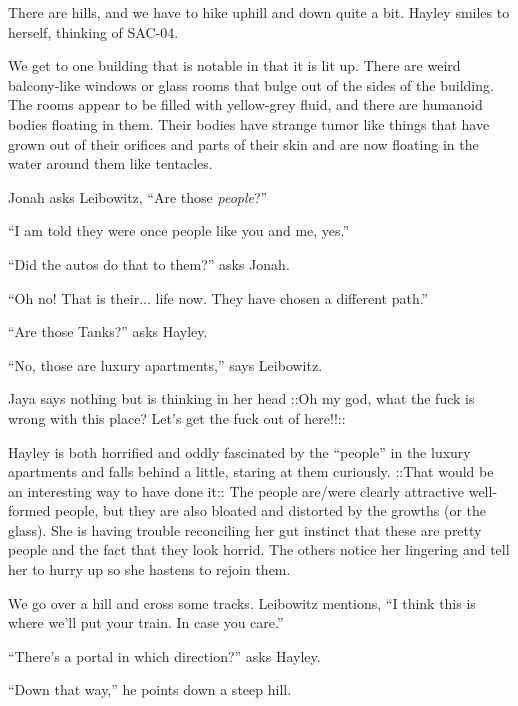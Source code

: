 There are hills, and we have to hike uphill and down quite a bit.  Hayley smiles to herself, thinking of SAC-04.  



We get to one building that is notable in that it is lit up.  There are weird balcony-like windows or glass rooms that bulge out of the sides of the building.  The rooms appear to be filled with yellow-grey fluid, and there are humanoid bodies floating in them.  Their bodies have strange tumor like things that have grown out of their orifices and parts of their skin and are now floating in the water around them like tentacles.



Jonah asks Leibowitz, ``Are those \textit{people}?''

``I am told they were once people like you and me, yes.''

``Did the autos do that to them?'' asks Jonah.

``Oh no!  That is their... life now. They have chosen a different path.''

``Are those Tanks?'' asks Hayley.

``No, those are luxury apartments,'' says Leibowitz.

Jaya says nothing but is thinking in her head {\color[RGB]{255,0,0} ::Oh my god, what the fuck is wrong with this place?  Let's get the fuck out of here!!::} 



Hayley is both horrified and oddly fascinated by the ``people'' in the luxury apartments and falls behind a little, staring at them curiously.   {\color[RGB]{255,153,0}::That would be an interesting way to have done it::  } The people are/were clearly attractive well-formed people, but they are also bloated and distorted by the growths (or the glass).  She is having trouble reconciling her gut instinct that these are pretty people and the fact that they look horrid.  The others notice her lingering and tell her to hurry up so she hastens to rejoin them.





We go over a hill and cross some tracks.  Leibowitz mentions, ``I think this is where we'll put your train. In case you care.''

``There's a portal in which direction?'' asks Hayley.

``Down that way,'' he points down a steep hill. 



